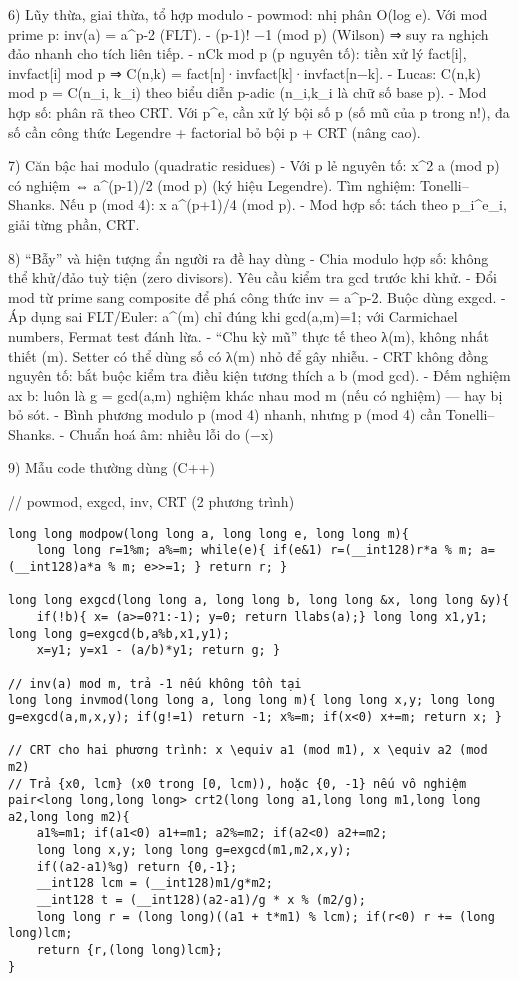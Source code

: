 6) Lũy thừa, giai thừa, tổ hợp modulo
- powmod: nhị phân O(log e). Với mod prime p: inv(a) = a^{p-2} (FLT).
- (p-1)! \equiv −1 (mod p) (Wilson) ⇒ suy ra nghịch đảo nhanh cho tích liên tiếp.
- nCk mod p (p nguyên tố): tiền xử lý fact[i], invfact[i] mod p ⇒ C(n,k) = fact[n]·invfact[k]·invfact[n−k].
- Lucas: C(n,k) mod p = \prod C(n_i, k_i) theo biểu diễn p-adic (n_i,k_i là chữ số base p).
- Mod hợp số: phân rã theo CRT. Với p^e, cần xử lý bội số p (số mũ của p trong n!), đa số cần công thức Legendre + factorial bỏ bội p + CRT (nâng cao).

7) Căn bậc hai modulo (quadratic residues)
- Với p lẻ nguyên tố: x^2 \equiv a (mod p) có nghiệm ⇔ a^{(p-1)/2}  (mod p) (ký hiệu Legendre). Tìm nghiệm: Tonelli–Shanks. Nếu p  (mod 4): x \equiv \pm a^{(p+1)/4} (mod p).
- Mod hợp số: tách theo p_i^{e_i}, giải từng phần, CRT.

8) “Bẫy” và hiện tượng ẩn người ra đề hay dùng
- Chia modulo hợp số: không thể khử/đảo tuỳ tiện (zero divisors). Yêu cầu kiểm tra gcd trước khi khử.
- Đổi mod từ prime sang composite để phá công thức inv = a^{p-2}. Buộc dùng exgcd.
- Áp dụng sai FLT/Euler: a^{\varphi(m)}  chỉ đúng khi gcd(a,m)=1; với Carmichael numbers, Fermat test đánh lừa.
- “Chu kỳ mũ” thực tế theo λ(m), không nhất thiết \varphi(m). Setter có thể dùng số có λ(m) nhỏ để gây nhiễu.
- CRT không đồng nguyên tố: bắt buộc kiểm tra điều kiện tương thích a \equiv b (mod gcd).
- Đếm nghiệm ax \equiv b: luôn là g = gcd(a,m) nghiệm khác nhau mod m (nếu có nghiệm) — hay bị bỏ sót.
- Bình phương modulo p  (mod 4) nhanh, nhưng p  (mod 4) cần Tonelli–Shanks.
- Chuẩn hoá âm: nhiều lỗi do (−x) %

9) Mẫu code thường dùng (C++)

// powmod, exgcd, inv, CRT (2 phương trình)
\begin{verbatim}
long long modpow(long long a, long long e, long long m){
    long long r=1%m; a%=m; while(e){ if(e&1) r=(__int128)r*a % m; a=(__int128)a*a % m; e>>=1; } return r; }

long long exgcd(long long a, long long b, long long &x, long long &y){
    if(!b){ x= (a>=0?1:-1); y=0; return llabs(a);} long long x1,y1; long long g=exgcd(b,a%b,x1,y1);
    x=y1; y=x1 - (a/b)*y1; return g; }

// inv(a) mod m, trả -1 nếu không tồn tại
long long invmod(long long a, long long m){ long long x,y; long long g=exgcd(a,m,x,y); if(g!=1) return -1; x%=m; if(x<0) x+=m; return x; }

// CRT cho hai phương trình: x \equiv a1 (mod m1), x \equiv a2 (mod m2)
// Trả {x0, lcm} (x0 trong [0, lcm)), hoặc {0, -1} nếu vô nghiệm
pair<long long,long long> crt2(long long a1,long long m1,long long a2,long long m2){
    a1%=m1; if(a1<0) a1+=m1; a2%=m2; if(a2<0) a2+=m2;
    long long x,y; long long g=exgcd(m1,m2,x,y);
    if((a2-a1)%g) return {0,-1};
    __int128 lcm = (__int128)m1/g*m2;
    __int128 t = (__int128)(a2-a1)/g * x % (m2/g);
    long long r = (long long)((a1 + t*m1) % lcm); if(r<0) r += (long long)lcm;
    return {r,(long long)lcm};
}
\end{verbatim}

